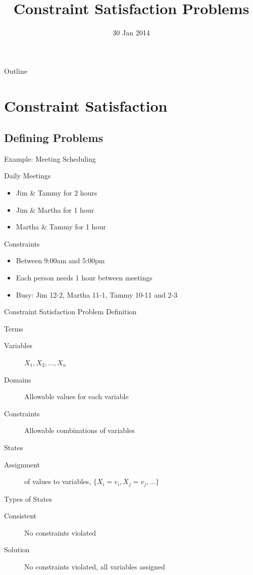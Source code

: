 \documentclass[14pt]{beamer}
\title{Constraint Satisfaction Problems}
\date[]{30 Jan 2014}
\begin{document}
\begin{frame}
  \titlepage
\end{frame}

\begin{frame}{Outline}
  \tableofcontents
\end{frame}

\section{Constraint Satisfaction}

\subsection{Defining Problems}
\begin{frame}{Example: Meeting Scheduling}
	\begin{block}{Daily Meetings}
		\begin{itemize}
			\item Jim \& Tammy for 2 hours
			\item Jim \& Martha for 1 hour
			\item Martha \& Tammy for 1 hour
		\end{itemize}
	\end{block}
	\begin{block}{Constraints}
		\begin{itemize}
			\item Between 9:00am and 5:00pm
			\item Each person needs 1 hour between meetings
			\item Busy: Jim 12-2, Martha 11-1, Tammy 10-11 and 2-3
		\end{itemize}
	\end{block}
\end{frame}
\begin{frame}{Constraint Satisfaction Problem Definition}
	\begin{block}{Terms}
		\begin{description}
			\item[Variables] $X_1, X_2, \ldots, X_n$
			\item[Domains] Allowable values for each variable
			\item[Constraints] Allowable combinations of variables
		\end{description}
	\end{block}
	\begin{block}{States}
		\begin{description}
			\item[Assignment] of values to variables, $\{X_i=v_i, X_j=v_j, \ldots\}$
		\end{description}
	\end{block}
	\begin{block}{Types of States}
		\begin{description}
			\item[Consistent] No constraints violated
			\item[Solution] No constraints violated, all variables assigned
		\end{description}
	\end{block}
\end{frame}
\end{document}
